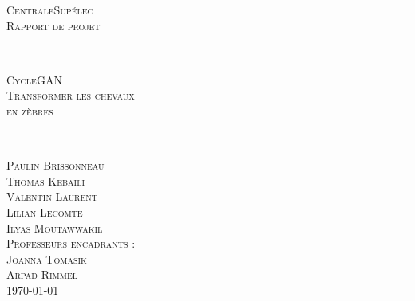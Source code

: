 \documentclass[a4paper]{report}
\newcommand{\HRule}{\rule{\linewidth}{0.5mm}}
\begin{document}
\begin{titlepage}
  \begin{sffamily}
  \begin{center}

    \textsc{\Large CentraleSupélec}\\[2cm]
    
    \textsc{\huge Rapport de projet}\\[1cm]

	\HRule \\[0.55cm]
    \textsc{\Huge CycleGAN \\[0.2cm] \huge Transformer les chevaux\\en zèbres}\\[0.6cm]
	\HRule \\[3cm]
    
 
  
    \textsc{\large Paulin Brissonneau\\
    	Thomas Kebaili\\
    	Valentin Laurent\\
    	Lilian Lecomte\\
    	Ilyas Moutawwakil}\\[1cm]
        
    \textsc{\large Professeurs encadrants :\\
        Joanna Tomasik\\
        Arpad Rimmel}\\


    \vfill
	{\textsc{\large\today}}
  \end{center}
  \end{sffamily}
\end{titlepage}



\tableofcontents









\newpage



\end{document}
